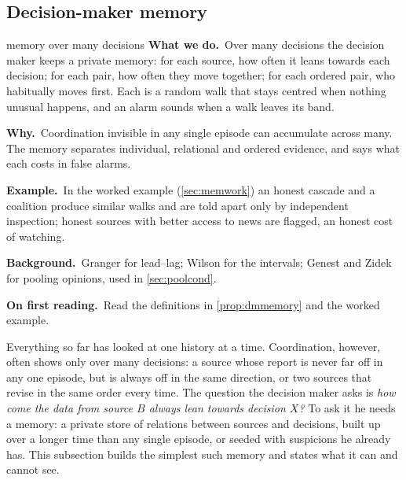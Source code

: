 \documentclass[11pt]{article}
\theoremstyle{definition}\newtheorem{definition}[theorem]{Definition}\newtheorem{remark}[theorem]{Remark}\newtheorem{example}[theorem]{Example}\newtheorem{problem}[theorem]{Open problem}\crefname{problem}{Problem}{Problems}
\newcommand{\rbwhat}{\textcolor{rbWhat}{\textbf{What we do.}}~}\newcommand{\rbwhy}{\par\smallskip\textcolor{rbWhy}{\textbf{Why.}}~}
\newcommand{\rbex}{\par\smallskip\textcolor{rbEx}{\textbf{Example.}}~}\newcommand{\rbbg}{\par\smallskip\textcolor{rbBg}{\textbf{Background.}}~}
\newcommand{\rbfirst}{\par\smallskip\textcolor{rbFirst}{\textbf{On first reading.}}~}
\begin{document}
\subsection{Decision-maker memory}\label{sec:dmmemory}
\begin{readerbox}{memory over many decisions}
\rbwhat Over many decisions the decision maker keeps a private memory: for each source, how often it leans towards each decision; for each pair, how often they move together; for each ordered pair, who habitually moves first. Each is a random walk that stays centred when nothing unusual happens, and an alarm sounds when a walk leaves its band.
\rbwhy Coordination invisible in any single episode can accumulate across many. The memory separates individual, relational and ordered evidence, and says what each costs in false alarms.
\rbex In the worked example (\cref{sec:memwork}) an honest cascade and a coalition produce similar walks and are told apart only by independent inspection; honest sources with better access to news are flagged, an honest cost of watching.
\rbbg Granger \cite{Granger1969} for lead--lag; Wilson \cite{Wilson1927} for the intervals; Genest and Zidek \cite{GenestZidek1986} for pooling opinions, used in \cref{sec:poolcond}.
\rbfirst Read the definitions in \cref{prop:dmmemory} and the worked example.
\end{readerbox}
Everything so far has looked at one history at a time. Coordination, however, often shows only over many decisions: a source whose report is never far off in any one episode, but is always off in the same direction, or two sources that revise in the same order every time. The question the decision maker asks is \emph{how come the data from source $B$ always lean towards decision $X$?} To ask it he needs a memory: a private store of relations between sources and decisions, built up over a longer time than any single episode, or seeded with suspicions he already has. This subsection builds the simplest such memory and states what it can and cannot see.
\end{document}
